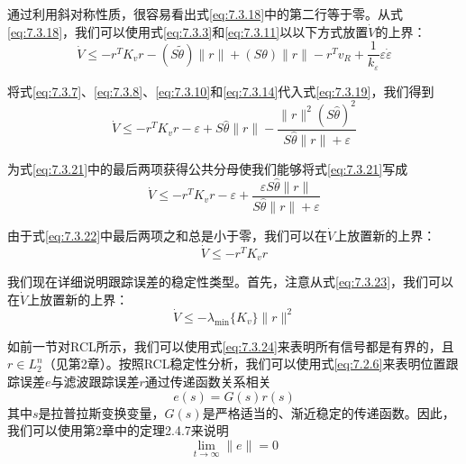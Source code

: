 \documentclass[UTF8]{ctexart}
\begin{document}
通过利用斜对称性质，很容易看出式\eqref{eq:7.3.18}中的第二行等于零。从式\eqref{eq:7.3.18}，我们可以使用式\eqref{eq:7.3.3}和\eqref{eq:7.3.11}以以下方式放置$\dot{V}$的上界：
\begin{equation}\label{eq:7.3.19}
\dot{V} \leq -r^T K_v r - (S\tilde{\theta})\|r\| + (S\theta)\|r\| - r^T v_R + \frac{1}{k_\varepsilon}\varepsilon\dot{\varepsilon}
\end{equation}

\addtocounter{equation}{1}%

将式\eqref{eq:7.3.7}、\eqref{eq:7.3.8}、\eqref{eq:7.3.10}和\eqref{eq:7.3.14}代入式\eqref{eq:7.3.19}，我们得到
\begin{equation}\label{eq:7.3.21}
\dot{V} \leq -r^T K_v r - \varepsilon + S\hat{\theta}\|r\| - \frac{\|r\|^2 (S\hat{\theta})^2}{S\hat{\theta}\|r\| + \varepsilon}
\end{equation}

为式\eqref{eq:7.3.21}中的最后两项获得公共分母使我们能够将式\eqref{eq:7.3.21}写成
\begin{equation}\label{eq:7.3.22}
\dot{V} \leq -r^T K_v r - \varepsilon + \frac{\varepsilon S\hat{\theta}\|r\|}{S\hat{\theta}\|r\| + \varepsilon}
\end{equation}

由于式\eqref{eq:7.3.22}中最后两项之和总是小于零，我们可以在$\dot{V}$上放置新的上界：
\begin{equation}\label{eq:7.3.23}
\dot{V} \leq -r^T K_v r
\end{equation}

我们现在详细说明跟踪误差的稳定性类型。首先，注意从式\eqref{eq:7.3.23}，我们可以在$\dot{V}$上放置新的上界：
\begin{equation}\label{eq:7.3.24}
\dot{V} \leq -\lambda_{\min}\{K_v\}\|r\|^2
\end{equation}

如前一节对RCL所示，我们可以使用式\eqref{eq:7.3.24}来表明所有信号都是有界的，且$r \in L_2^n$（见第2章）。按照RCL稳定性分析，我们可以使用式\eqref{eq:7.2.6}来表明位置跟踪误差$e$与滤波跟踪误差$r$通过传递函数关系相关
\begin{equation}\label{eq:7.3.25}
e(s) = G(s)r(s)
\end{equation}
其中$s$是拉普拉斯变换变量，$G(s)$是严格适当的、渐近稳定的传递函数。因此，我们可以使用第2章中的定理2.4.7来说明
\begin{equation}\label{eq:7.3.26}
\lim_{t \to \infty} \|e\| = 0
\end{equation}
\end{document}
